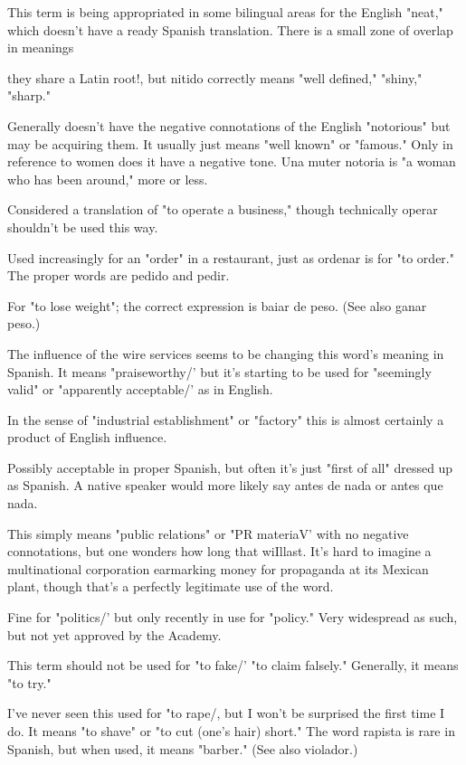  This term is being appropriated in some bilingual
areas for the English "neat," which doesn't have a ready Spanish translation. There is a small zone of overlap in meanings {they share a Latin
root!, but nitido correctly means "well defined," "shiny," "sharp."

 Generally doesn't have the negative connotations
of the English "notorious" but may be acquiring them. It usually just
means "well known" or "famous." Only in reference to women does it
have a negative tone. Una muter notoria is "a woman who has been
around," more or less.

 Considered a translation of "to operate a business," though technically operar shouldn't be used this way.

 Used increasingly for an "order" in a restaurant, just
as ordenar is for "to order." The proper words are pedido and pedir.

 For "to lose weight"; the correct expression is
baiar de peso. (See also ganar peso.)

 The influence of the wire services seems to be
changing this word's meaning in Spanish. It means "praiseworthy/' but
it's starting to be used for "seemingly valid" or "apparently acceptable/' as in English.

 In the sense of "industrial establishment" or "factory" this is almost certainly a product of English influence.

 Possibly acceptable in proper Spanish,
but often it's just "first of all" dressed up as Spanish. A native speaker
would more likely say antes de nada or antes que nada.

 This simply means "public relations" or "PR
materiaV' with no negative connotations, but one wonders how long
that wiIllast. It's hard to imagine a multinational corporation earmarking money for propaganda at its Mexican plant, though that's
a perfectly legitimate use of the word.

 Fine for "politics/' but only recently in use for "policy." Very widespread as such, but not yet approved by the Academy.

 This term should not be used for "to fake/' "to
claim falsely." Generally, it means "to try."

 I've never seen this used for "to rape/, but I won't be
surprised the first time I do. It means "to shave" or "to cut (one's hair)
short." The word rapista is rare in Spanish, but when used, it means
"barber." (See also violador.)

}
